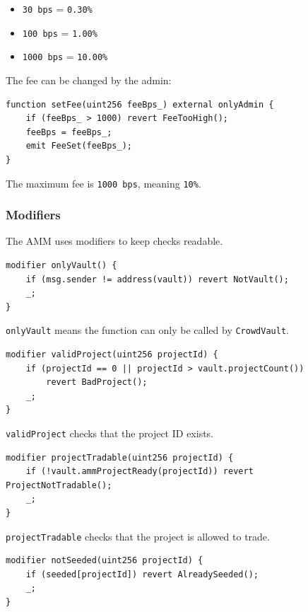 \documentclass[11pt,a4paper]{article}
\begin{document}
\begin{itemize}
  \item \texttt{30 bps} = \texttt{0.30\%}
  \item \texttt{100 bps} = \texttt{1.00\%}
  \item \texttt{1000 bps} = \texttt{10.00\%}
\end{itemize}

The fee can be changed by the admin:

\begin{lstlisting}
function setFee(uint256 feeBps_) external onlyAdmin {
    if (feeBps_ > 1000) revert FeeTooHigh();
    feeBps = feeBps_;
    emit FeeSet(feeBps_);
}
\end{lstlisting}

The maximum fee is \texttt{1000 bps}, meaning \texttt{10\%}.

\subsubsection{Modifiers}

The AMM uses modifiers to keep checks readable.

\begin{lstlisting}
modifier onlyVault() {
    if (msg.sender != address(vault)) revert NotVault();
    _;
}
\end{lstlisting}

\texttt{onlyVault} means the function can only be called by \texttt{CrowdVault}.

\begin{lstlisting}
modifier validProject(uint256 projectId) {
    if (projectId == 0 || projectId > vault.projectCount())
        revert BadProject();
    _;
}
\end{lstlisting}

\texttt{validProject} checks that the project ID exists.

\begin{lstlisting}
modifier projectTradable(uint256 projectId) {
    if (!vault.ammProjectReady(projectId)) revert ProjectNotTradable();
    _;
}
\end{lstlisting}

\texttt{projectTradable} checks that the project is allowed to trade.

\begin{lstlisting}
modifier notSeeded(uint256 projectId) {
    if (seeded[projectId]) revert AlreadySeeded();
    _;
}
\end{lstlisting}
\end{document}
